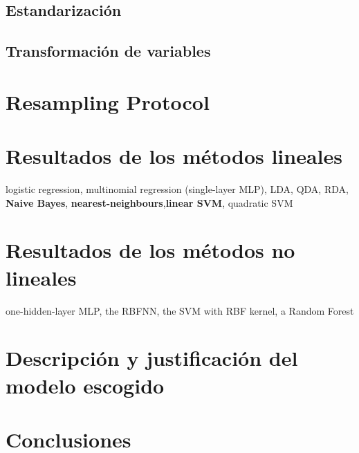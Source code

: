 \documentclass[a4paper]{article}
\begin{document}
\subsection{Estandarización}

\subsection{Transformación de variables}

\section{Resampling Protocol}

\section{Resultados de los métodos lineales}
logistic regression, multinomial regression
(single-layer MLP), LDA, QDA, RDA, \textbf{Naive Bayes}, \textbf{nearest-neighbours},\textbf{linear SVM}, quadratic SVM
\section{Resultados de los métodos no lineales}
one-hidden-layer MLP, the RBFNN, the SVM with RBF kernel, a
Random Forest
\section{Descripción y justificación del modelo escogido}

\section{Conclusiones}
\end{document}
